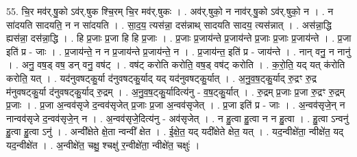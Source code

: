 \documentclass[17pt]{extarticle}
\begin{document}
55. चि॒र मव॑र्.षु॒को ऽव॑र्.षुक श्चि॒रम् चि॒र मव॑र्.षुकः । . अव॑र्.षुको॒ न नाव॑र्.षु॒को ऽव॑र्.षुको॒ न । . न सा॑दयति सादयति॒ न न सा॑दयति । . सा॒द॒य॒ त्यस॑न्ना॒ दस॑न्नाथ् सादयति सादय॒ त्यस॑न्नात् । . अस॑न्ना॒द्धि ह्यस॑न्ना॒ दस॑न्ना॒द्धि । . हि प्र॒जाः प्र॒जा हि हि प्र॒जाः । . प्र॒जाः प्र॒जाय॑न्ते प्र॒जाय॑न्ते प्र॒जाः प्र॒जाः प्र॒जाय॑न्ते । . प्र॒जा इति॑ प्र - जाः । . प्र॒जाय॑न्ते॒ न न प्र॒जाय॑न्ते प्र॒जाय॑न्ते॒ न । . प्र॒जाय॑न्त॒ इति॑ प्र - जाय॑न्ते । . नान् वनु॒ न नानु॑ । . अनु॒ वष॒ड् वष॒ डन् वनु॒ वष॑ट् । . वष॑ट् करोति करोति॒ वष॒ड् वष॑ट् करोति । . क॒रो॒ति॒ यद् यत् क॑रोति करोति॒ यत् । . यद॑नुवषट्कु॒र्या द॑नुवषट्कु॒र्याद् यद् यद॑नुवषट्कु॒र्यात् । . अ॒नु॒व॒ष॒ट्कु॒र्याद् रु॒द्रꣳ रु॒द्र म॑नुवषट्कु॒र्या द॑नुवषट्कु॒र्याद् रु॒द्रम् । . अ॒नु॒व॒ष॒ट्कु॒र्यादित्य॑नु - व॒ष॒ट्कु॒र्यात् । . रु॒द्रम् प्र॒जाः प्र॒जा रु॒द्रꣳ रु॒द्रम् प्र॒जाः । . प्र॒जा अ॒न्वव॑सृजे द॒न्वव॑सृजेत् प्र॒जाः प्र॒जा अ॒न्वव॑सृजेत् । . प्र॒जा इति॑ प्र - जाः । . अ॒न्वव॑सृजे॒न् न नान्वव॑सृजे द॒न्वव॑सृजे॒न् न । . अ॒न्वव॑सृजे॒दित्य॑नु - अव॑सृजेत् । . न हु॒त्वा हु॒त्वा न न हु॒त्वा । . हु॒त्वा ऽन्वनु॑ हु॒त्वा हु॒त्वा ऽनु॑ । . अन्वी᳚क्षेते क्षे॒ता न्वन्वी᳚ क्षेत । . ई॒क्षे॒त॒ यद् यदी᳚क्षेते क्षेत॒ यत् । . यद॒न्वीक्षे॑ता॒ न्वीक्षे॑त॒ यद् यद॒न्वीक्षे॑त । . अ॒न्वीक्षे॑त॒ चक्षु॒ श्चक्षु॑ र॒न्वीक्षे॑ता॒ न्वीक्षे॑त॒ चक्षुः॑ । \newline
\end{document}
